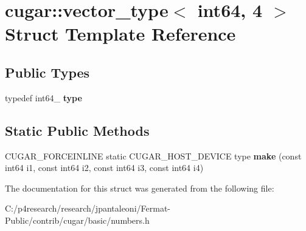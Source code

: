 \hypertarget{structcugar_1_1vector__type_3_01int64_00_014_01_4}{}\section{cugar\+:\+:vector\+\_\+type$<$ int64, 4 $>$ Struct Template Reference}
\label{structcugar_1_1vector__type_3_01int64_00_014_01_4}
\subsection*{Public Types}
\begin{DoxyCompactItemize}
\item 
\mbox{\label{structcugar_1_1vector__type_3_01int64_00_014_01_4_abcbbd579c2f0b6e1dda78b284677f77b}} 
typedef int64\+\_ {\bfseries type}
\end{DoxyCompactItemize}
\subsection*{Static Public Methods}
\begin{DoxyCompactItemize}
\item 
\mbox{\label{structcugar_1_1vector__type_3_01int64_00_014_01_4_a757b9cc955b2509fb38a9c883c5b1c06}} 
C\+U\+G\+A\+R\+\_\+\+F\+O\+R\+C\+E\+I\+N\+L\+I\+NE static C\+U\+G\+A\+R\+\_\+\+H\+O\+S\+T\+\_\+\+D\+E\+V\+I\+CE type {\bfseries make} (const int64 i1, const int64 i2, const int64 i3, const int64 i4)
\end{DoxyCompactItemize}


The documentation for this struct was generated from the following file\+:\begin{DoxyCompactItemize}
\item 
C\+:/p4research/research/jpantaleoni/\+Fermat-\/\+Public/contrib/cugar/basic/numbers.\+h\end{DoxyCompactItemize}
